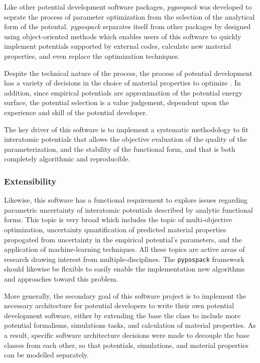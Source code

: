 Like other potential development software packages, \emph{pypospack} was developed to seprate the process of parameter optimization from the selection of the analytical form of the potental.  \emph{pypospack} separates itself from other packages by designed using object-oriented methods which enables users of this software to quickly implement potentials supported by external codes, calculate new material properties, and even replace the optimization techniques.

Despite the technical nature of the process, the process of potential development has a variety of decisions in the choice of material properties to optimize .  In addition, since empirical potentials are approximation of the potential energy surface, the potential selection is a value judgement, dependent upon the experience and skill of the potential developer.

The key driver of this software is to implement a systematic methodology to fit interatomic potentials that allows the objective evaluation of the quality of the parameterization, and the stability of the functional form, and that is both completely algorithmic and reproducible.

\subsubsection{Extensibility}

Likewise, this software has a functional requirement to explore issues regarding parametric uncertainty of interatomic potentials described by analytic functional forms.
This topic is very broad which includes the topic of multi-objective optimization, uncertainty quantification of predicted material properties propogated from uncertainty in the empirical potential's parameters, and the application of machine-learning techniques.
All these topics are active areas of research drawing interest from multiple-disciplines.  The \verb|pypospack| framework should likewise be flexible to easily enable the implementation new algorithms and approaches toward this problem.

More generally, the secondary goal of this software project is to implement the necessary architecture for potential developers to write their own potential development software, either by extending the base the class to include more potential formalisms, simulations tasks, and calculation of material properties.  As a result, specific software architecture decisions were made to decouple the base classes from each other, so that potentials, simulations, and material properties can be modelled separately.

